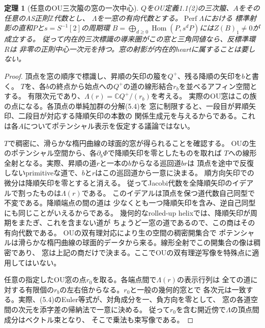 \documentclass[11pt,a4paper]{ltjsarticle}
\newtheorem{theorem}{定理}[section]
\theoremstyle{definition}
\newcommand{\Perf}{\operatorname{Perf}}
\begin{document}
\begin{theorem}[任意のOU三次箙の窓の一次中心]
\label{thm:ou-all-windows-central-section}
$Q$をOU定義1.1(2)の三次箙、$A$をその任意のAS正則$\mathbb Z$代数とし、
$\Lambda$を一窓の有向代数とする。$\Perf\Lambda$における
標準射影の直和$P$と$s=S^{-1}[2]$の周期環
$B=\bigoplus_{d\ge0}\operatorname{Hom}(P,s^dP)$には$Z(B)_1\ne0$が成立する。
従って内在的三次標識の導来圏がこの窓と三角同値なら、反標準環$R$は
非零の正則中心一次元を持つ。窓の射影が内在的heartに属することは要しない。
\end{theorem}
\begin{proof}
頂点を窓の順序で標識し、昇順の矢印の箙を$Q^+$、残る降順の矢印を$b$と書く。
$T$を、各$b$の終点から始点への$Q^+$の道の線形結合$r_b$を並べるアフィン空間とする。
有限次元であり、$\Lambda(r)=\mathbb C Q^+/(r_b)$を考える。
実際のOU窓はこの族の点になる。各頂点の単純加群の分解(5.4)を
窓に制限すると、一段目が昇順矢印、二段目が対応する降順矢印の本数の
関係生成元を与えるからである。これは各$A$についてポテンシャル表示を仮定する議論ではない。

$T$で稠密に、滑らかな楕円曲線の球面的窓が得られることを確認する。
OUの生のポテンシャル空間から、各$\partial_b\Phi$で降順矢印を零としたものを取れば
$T$への線形全射となる。実際、昇順の道$r$と一本の$b$からなる巡回道$br$は
頂点を途中で反復しないprimitiveな道で、$b$と$r$はこの巡回道から一意に決まる。
順方向矢印での微分は降順矢印を零とすると消える。
従ってJacobi代数を全降順矢印のイデアルで割ったものは$\Lambda(r)$である。
このイデアルは頂点を保つ道代数自己同型で不変である。降順端点の間の道は
少なくとも一つ降順矢印を含み、逆自己同型にも同じことがいえるからである。
幾何的なrolled-up helixでは、降順矢印が周期をまたぎ、これを含まない道が
ちょうど一窓の道であるので、この商はその有向代数である。
OU\cite[Definition~6.3, Theorem~6.4]{OU}の双有理対応により生の空間の稠密開集合で
ポテンシャルは滑らかな楕円曲線の球面的データから来る。線形全射でこの開集合の像は稠密であり、
窓は上記の商だけで決まる。ここでOUの双有理逆写像を特殊点に適用してはいない。

任意の指定したOU窓の点$r_0$を取る。各端点間で$\Lambda(r)$の表示行列は
全ての道に対する有限個の$r_b$の左右倍からなる。$r_0$と一般の幾何的窓とで
各次元は一致する。実際、(5.4)のEuler等式が、対角成分を一、負方向を零として、
窓の各道空間の次元を添字差の帰納法で一意に決める。
従って$r_0$を含む開近傍で$\Lambda$の頂点間成分はベクトル束となり、
そこで乗法も束写像である。


\end{proof}
\end{document}
